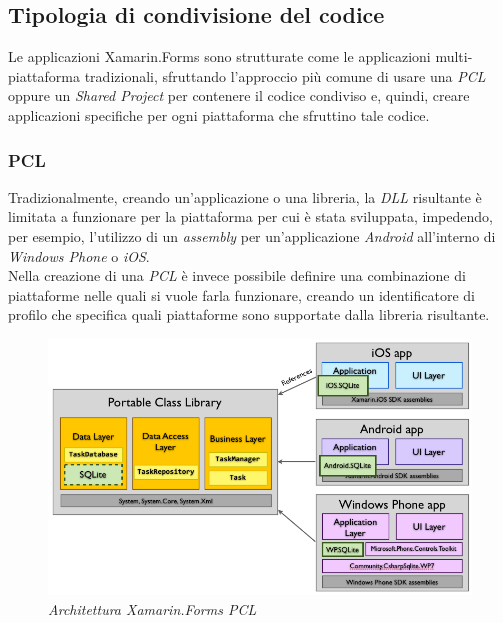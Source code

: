 \subsection{Tipologia di condivisione del codice}
Le applicazioni Xamarin.Forms sono strutturate come le applicazioni multi-piattaforma tradizionali, sfruttando l'approccio più comune di usare una \textit{PCL} oppure un \textit{Shared Project} per contenere il codice condiviso e, quindi, creare applicazioni specifiche per ogni piattaforma che sfruttino tale codice. 
\subsubsection{PCL}
Tradizionalmente, creando un'applicazione o una libreria, la \textit{DLL} risultante è limitata a funzionare per la piattaforma per cui è stata sviluppata, impedendo, per esempio, l'utilizzo di un \textit{assembly} per un'applicazione \textit{Android} all'interno di \textit{Windows Phone} o \textit{iOS}.
\\
Nella creazione di una \textit{PCL} è invece possibile definire una combinazione di piattaforme nelle quali si vuole farla funzionare, creando un identificatore di profilo che specifica quali piattaforme sono supportate dalla libreria risultante.

\begin{figure}[ht]
	\centering
	\includegraphics[scale=0.40]{immagini/progettazione/PortableClassLibrary.png}
	\caption{\textit{Architettura Xamarin.Forms PCL}}
\end{figure}\FloatBarrier

